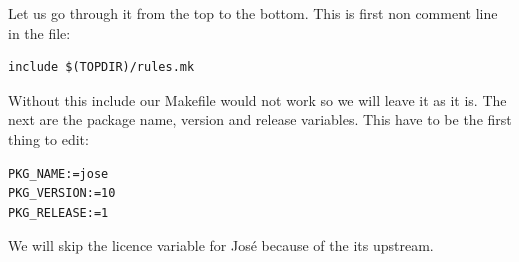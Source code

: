 Let us go through it from the top to the bottom.
This is first non comment line in the file:
\begin{lstlisting}[columns=fixed,basicstyle=\ttfamily\footnotesize,tabsize=4,backgroundcolor=\color{yellow!10}]
include $(TOPDIR)/rules.mk
\end{lstlisting}
Without this include our Makefile would not work so we will leave it as it is.
The next are the package name, version and release variables.
This have to be the first thing to edit:
\begin{lstlisting}[columns=fixed,basicstyle=\ttfamily\footnotesize,tabsize=4,backgroundcolor=\color{yellow!10}]
PKG_NAME:=jose
PKG_VERSION:=10
PKG_RELEASE:=1
\end{lstlisting}
We will skip the licence variable for José because of the its upstream.

